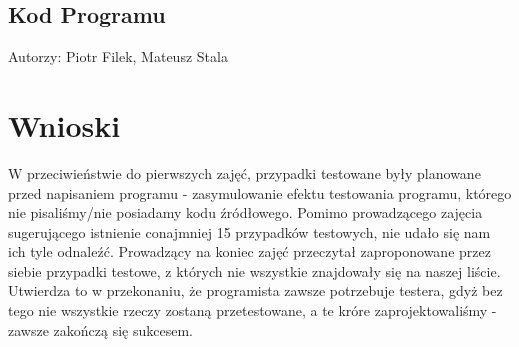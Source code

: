 \documentclass{article}
\begin{document}
\subsection{Kod Programu}
Autorzy: Piotr Filek, Mateusz Stala


\section{Wnioski}
\label{sec:wnioski}

W przeciwieństwie do pierwszych zajęć, przypadki testowane były planowane przed napisaniem programu - zasymulowanie efektu testowania programu, którego nie pisaliśmy/nie posiadamy kodu źródłowego. Pomimo prowadzącego zajęcia sugerującego istnienie conajmniej 15 przypadków testowych, nie udało się nam ich tyle odnaleźć. Prowadzący na koniec zajęć przeczytał zaproponowane przez siebie przypadki testowe, z których nie wszystkie znajdowały się na naszej liście. Utwierdza to w przekonaniu, że programista zawsze potrzebuje testera, gdyż bez tego nie wszystkie rzeczy zostaną przetestowane, a te króre zaprojektowaliśmy - zawsze zakończą się sukcesem.
\end{document}

